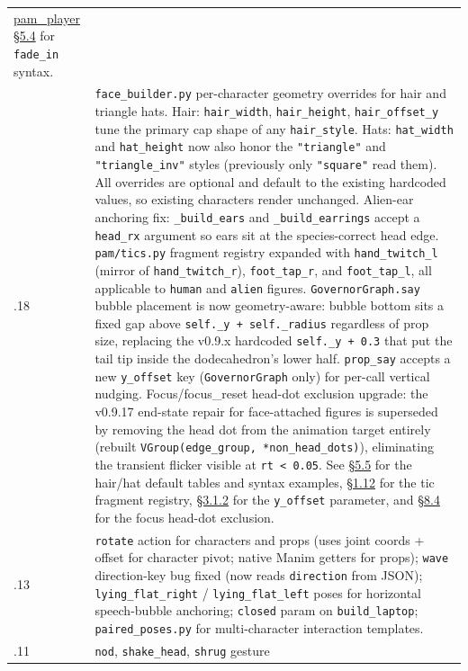 \documentclass[
  11pt,
]{book}
\begin{document}
\begin{longtable}[]{@{}
  >{\raggedright\arraybackslash}p{}
  >{\raggedright\arraybackslash}p{}@{}}
\hyperref[fade-in-z-index]{pam\_player §5.4} for
\texttt{fade\_in} syntax. \\
0.9.18 & \texttt{face\_builder.py} per-character geometry overrides for
hair and triangle hats. Hair: \texttt{hair\_width}, \texttt{hair\_height},
\texttt{hair\_offset\_y} tune the primary cap shape of any
\texttt{hair\_style}. Hats: \texttt{hat\_width} and \texttt{hat\_height}
now also honor the \texttt{"triangle"} and \texttt{"triangle\_inv"}
styles (previously only \texttt{"square"} read them). All overrides are
optional and default to the existing hardcoded values, so existing
characters render unchanged. Alien-ear anchoring fix: \texttt{\_build\_ears}
and \texttt{\_build\_earrings} accept a \texttt{head\_rx} argument so
ears sit at the species-correct head edge. \texttt{pam/tics.py}
fragment registry expanded with \texttt{hand\_twitch\_l} (mirror of
\texttt{hand\_twitch\_r}), \texttt{foot\_tap\_r}, and
\texttt{foot\_tap\_l}, all applicable to \texttt{human} and
\texttt{alien} figures.
\texttt{GovernorGraph.say} bubble placement is now geometry-aware:
bubble bottom sits a fixed gap above
\texttt{self.\_y\ +\ self.\_radius} regardless of prop size, replacing
the v0.9.x hardcoded \texttt{self.\_y\ +\ 0.3} that put the tail tip
inside the dodecahedron's lower half. \texttt{prop\_say} accepts a new
\texttt{y\_offset} key (\texttt{GovernorGraph} only) for per-call
vertical nudging.
Focus/focus\_reset head-dot exclusion upgrade: the v0.9.17 end-state
repair for face-attached figures is superseded by removing the head
dot from the animation target entirely (rebuilt
\texttt{VGroup(edge\_group,\ *non\_head\_dots)}), eliminating the
transient flicker visible at \texttt{rt < 0.05}.
See \hyperref[hat-geometry-reference]{§5.5} for the hair/hat default
tables and syntax examples, \hyperref[tic_profile]{§1.12} for the
tic fragment registry, \hyperref[prop_say]{§3.1.2} for the
\texttt{y\_offset} parameter, and
\hyperref[the-focus_reset-overlay-gotcha]{§8.4} for the focus
head-dot exclusion. \\
0.9.13 & \texttt{rotate} action for characters and props (uses joint
coords + offset for character pivot; native Manim getters for props);
\texttt{wave} direction-key bug fixed (now reads \texttt{direction} from
JSON); \texttt{lying\_flat\_right} / \texttt{lying\_flat\_left} poses
for horizontal speech-bubble anchoring; \texttt{closed} param on
\texttt{build\_laptop}; \texttt{paired\_poses.py} for multi-character
interaction templates. \\
0.9.11 & \texttt{nod}, \texttt{shake\_head}, \texttt{shrug} gesture

\end{longtable}
\end{document}

